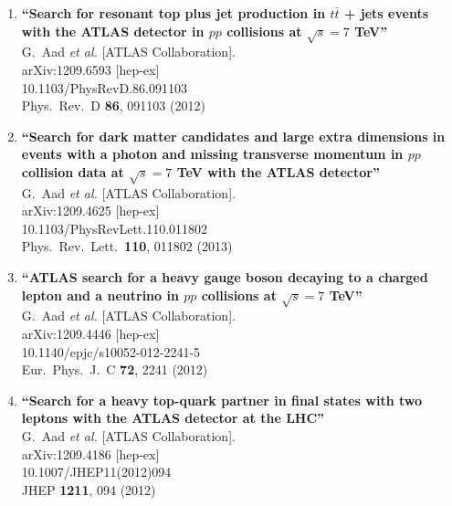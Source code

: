 \documentclass{article}
\begin{document}
\begin{enumerate}
\item%
{\bf ``Search for resonant top plus jet production in $t\bar{t}$ + jets events with the ATLAS detector in $pp$ collisions at $\sqrt{s}=7$ TeV''}
  \\{}G.~Aad {\it et al.}  [ATLAS Collaboration].
  \\{}arXiv:1209.6593 [hep-ex]
    \\{}10.1103/PhysRevD.86.091103
\\{}Phys.\ Rev.\ D {\bf 86}, 091103 (2012) %


\item%
{\bf ``Search for dark matter candidates and large extra dimensions in events with a photon and missing transverse momentum in $pp$ collision data at $\sqrt{s}=7$ TeV with the ATLAS detector''}
  \\{}G.~Aad {\it et al.}  [ATLAS Collaboration].
  \\{}arXiv:1209.4625 [hep-ex]
    \\{}10.1103/PhysRevLett.110.011802
\\{}Phys.\ Rev.\ Lett.\  {\bf 110}, 011802 (2013) %


\item%
{\bf ``ATLAS search for a heavy gauge boson decaying to a charged lepton and a neutrino in $pp$ collisions at $\sqrt{s}=7$ TeV''}
  \\{}G.~Aad {\it et al.}  [ATLAS Collaboration].
  \\{}arXiv:1209.4446 [hep-ex]
    \\{}10.1140/epjc/s10052-012-2241-5
\\{}Eur.\ Phys.\ J.\ C {\bf 72}, 2241 (2012) %


\item%
{\bf ``Search for a heavy top-quark partner in final states with two leptons with the ATLAS detector at the LHC''}
  \\{}G.~Aad {\it et al.}  [ATLAS Collaboration].
  \\{}arXiv:1209.4186 [hep-ex]
    \\{}10.1007/JHEP11(2012)094
\\{}JHEP {\bf 1211}, 094 (2012) %



\end{enumerate}
\end{document}

